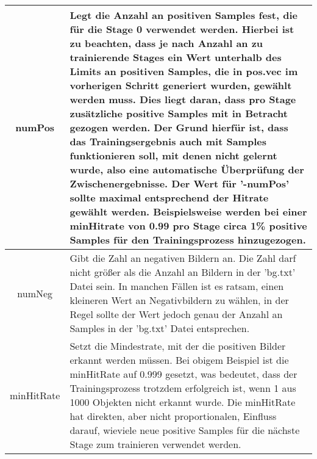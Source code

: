 \begin{table}[H]
\begin{tabularx}{\textwidth}{|c|X|}
\hline
numPos & Legt die Anzahl an positiven Samples fest, die für die Stage 0 verwendet werden. Hierbei ist zu beachten, dass je nach Anzahl an zu trainierende Stages ein Wert unterhalb des Limits an positiven Samples, die in pos.vec im vorherigen Schritt generiert wurden, gewählt werden muss. Dies liegt daran, dass pro Stage zusätzliche positive Samples mit in Betracht gezogen werden. Der Grund hierfür ist, dass das Trainingsergebnis auch mit Samples funktionieren soll, mit denen nicht gelernt wurde, also eine automatische Überprüfung der Zwischenergebnisse. Der Wert für '-numPos' sollte maximal entsprechend der Hitrate gewählt werden. Beispielsweise werden bei einer minHitrate von 0.99 pro Stage circa 1\% positive Samples für den Trainingsprozess hinzugezogen. \\ 
\hline
numNeg & Gibt die Zahl an negativen Bildern an. Die Zahl darf nicht größer als die Anzahl an Bildern in der 'bg.txt' Datei sein. In manchen Fällen ist es ratsam, einen kleineren Wert an Negativbildern zu wählen, in der Regel sollte der Wert jedoch genau der Anzahl an Samples in der 'bg.txt' Datei entsprechen. \\ 
\hline
minHitRate & Setzt die Mindestrate, mit der die positiven Bilder erkannt werden müssen. Bei obigem Beispiel ist die minHitRate auf 0.999 gesetzt, was bedeutet, dass der Trainingsprozess trotzdem erfolgreich ist, wenn 1 aus 1000 Objekten nicht erkannt wurde. Die minHitRate hat direkten, aber nicht proportionalen, Einfluss darauf, wieviele neue positive Samples für die nächste Stage zum trainieren verwendet werden. \\ 
\hline
\end{tabularx}
\end{table}

